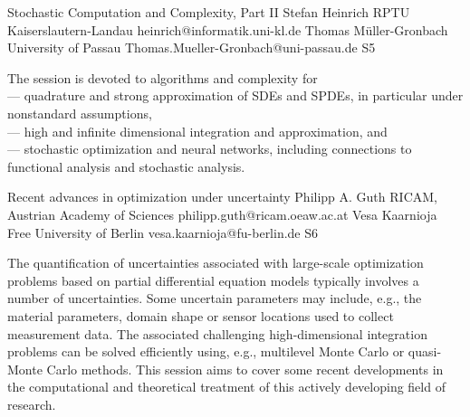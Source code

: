 

\clearpage

\begin{session}
 {Stochastic Computation and Complexity, Part II}%
 {Stefan Heinrich}%
 {RPTU Kaiserslautern-Landau}%
 {heinrich@informatik.uni-kl.de}%
 {Thomas M\"uller-Gronbach}%
 {University of Passau}%
 {Thomas.Mueller-Gronbach@uni-passau.de}%
 {S5}%
 {}%

 The session is devoted to algorithms and complexity for\\
 --- quadrature and strong approximation of SDEs and SPDEs, in particular under nonstandard assumptions,\\
 --- high and infinite dimensional integration and approximation, and\\
 --- stochastic optimization and neural networks,
 including connections to functional analysis and stochastic analysis.
\end{session}



\clearpage

\begin{session}
 {Recent advances in optimization under uncertainty}%
 {Philipp A. Guth}%
 {RICAM, Austrian Academy of Sciences}%
 {philipp.guth@ricam.oeaw.ac.at}%
 {Vesa Kaarnioja}%
 {Free University of Berlin}%
 {vesa.kaarnioja@fu-berlin.de}%
 {S6}%
{}

 The quantification of uncertainties associated with large-scale optimization problems based on partial differential equation models typically involves a number of uncertainties. Some uncertain parameters may include, e.g., the material parameters, domain shape or sensor locations used to collect measurement data. The associated challenging high-dimensional integration problems can be solved efficiently using, e.g., multilevel Monte Carlo or quasi-Monte Carlo methods. This session aims to cover some recent developments in the computational and theoretical treatment of this actively developing field of research.
\end{session}

